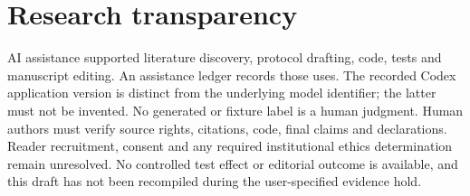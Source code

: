 \section{Research transparency}
AI assistance supported literature discovery, protocol drafting, code, tests
and manuscript editing. An assistance ledger records those uses. The recorded
Codex application version is distinct from the underlying model identifier;
the latter must not be invented. No generated or fixture label is a human
judgment. Human authors must verify source rights, citations, code, final claims
and declarations. Reader recruitment, consent and any required institutional
ethics determination remain unresolved. No controlled test effect or editorial
outcome is available, and this draft has not been recompiled during the
user-specified evidence hold.
